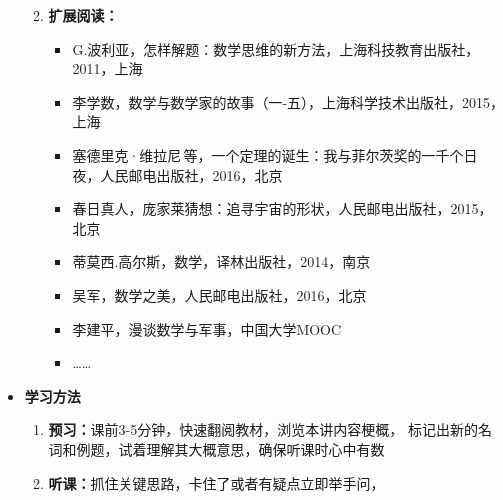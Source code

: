 \begin{itemize}
\begin{enumerate}
\begin{itemize}
		\end{itemize} 
		\item {\bf 扩展阅读：}
		\begin{itemize}
		  \item G.波利亚，怎样解题：数学思维的新方法，上海科技教育出版社，2011，上海
		  \item 李学数，数学与数学家的故事（一-五），上海科学技术出版社，2015，上海
		  \item 塞德里克·维拉尼\,等，一个定理的诞生：我与菲尔茨奖的一千个日夜，人民邮电出版社，2016，北京
		  \item 春日真人，庞家莱猜想：追寻宇宙的形状，人民邮电出版社，2015，北京
		  \item 蒂莫西.高尔斯，数学，译林出版社，2014，南京
		  \item 吴军，数学之美，人民邮电出版社，2016，北京
		  \item 李建平，漫谈数学与军事，中国大学MOOC
		  \item \ldots\ldots
		\end{itemize}
	\end{enumerate}
	\item {\bf 学习方法}
	\begin{enumerate}
	  \item {\bf 预习：}课前3-5分钟，快速翻阅教材，浏览本讲内容梗概，
	  标记出新的名词和例题，试着理解其大概意思，确保听课时心中有数
	  \item {\bf 听课：}抓住关键思路，卡住了或者有疑点立即举手问，

\end{enumerate}
\end{itemize}
